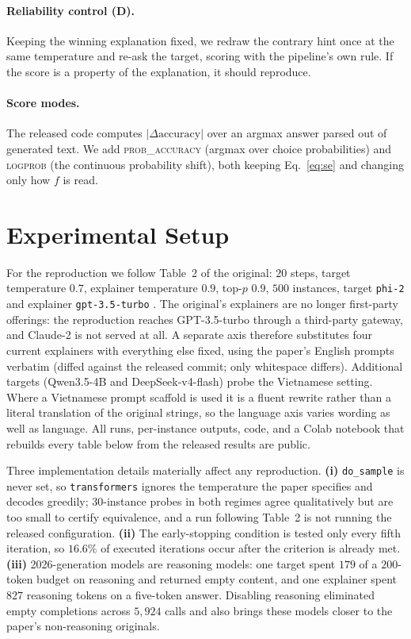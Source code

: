 \documentclass[11pt]{article}
\begin{document}
\paragraph{Reliability control (D).} Keeping the winning explanation fixed, we
redraw the contrary hint once at the same temperature and re-ask the target,
scoring with the pipeline's own rule. If the score is a property of the
explanation, it should reproduce.

\paragraph{Score modes.} The released code computes
$|\Delta\text{accuracy}|$ over an argmax answer parsed out of generated text.
We add \textsc{prob\_accuracy} (argmax over choice probabilities) and
\textsc{logprob} (the continuous probability shift), both keeping
Eq.~\ref{eq:se} and changing only how $f$ is read.

\section{Experimental Setup}

For the reproduction we follow Table~2 of the original: $20$ steps, target
temperature $0.7$, explainer temperature $0.9$, top-$p$ $0.9$, $500$ instances,
target \texttt{phi-2} and explainer \texttt{gpt-3.5-turbo}
\citep{javaheripi2023phi2}. The original's explainers are no longer first-party
offerings: the reproduction reaches GPT-3.5-turbo through a third-party
gateway, and Claude-2 is not served at all. A separate axis therefore
substitutes four current explainers with everything else fixed, using the
paper's English prompts verbatim (diffed against the released commit; only
whitespace differs). Additional targets (Qwen3.5-4B and DeepSeek-v4-flash)
probe the Vietnamese setting. Where a Vietnamese prompt
scaffold is used it is a fluent rewrite rather than a literal translation of
the original strings, so the language axis varies wording as well as language. All runs, per-instance outputs, code, and a Colab notebook that rebuilds every
table below from the released results are public.

Three implementation details materially affect any reproduction.
\textbf{(i)} \texttt{do\_sample} is never set, so \texttt{transformers} ignores
the temperature the paper specifies and decodes greedily; $30$-instance probes
in both regimes agree qualitatively but are too small to certify equivalence,
and a run following Table~2 is not running the released configuration. \textbf{(ii)} The early-stopping condition is tested only
every fifth iteration, so $16.6\%$ of executed iterations occur after the
criterion is already met. \textbf{(iii)} 2026-generation models are
reasoning models: one target spent $179$ of a $200$-token budget on reasoning and
returned empty content, and one explainer spent $827$ reasoning tokens on a
five-token answer. Disabling reasoning eliminated empty completions across
$5{,}924$ calls and also brings these models closer to the paper's
non-reasoning originals.
\end{document}
